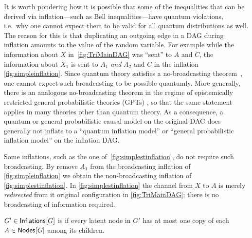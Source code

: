 It is worth pondering how it is possible that some of the inequalities that can be derived via inflation---such as Bell inequalities---have quantum violations, i.e.~why one cannot expect them to be valid for all quantum distributions as well. The reason for this is that duplicating an outgoing edge in a DAG during inflation amounts to  the value of the random variable. For example while the information about $X$ in~\cref{fig:TriMainDAG} was ``sent'' to $A$ and $C$, the information about $X_1$ is sent to $A_1$ \emph{and} $A_2$ and $C$ in the inflation \cref{fig:simpleinflation}. Since quantum theory satisfies a no-broadcasting theorem~\cite{NoCloningQuantum1996,NoCloningGeneral2006}, one cannot expect such broadcasting to be possible quantumly. More generally, there is an analogous no-broadcasting theorem in the regime of epistemically restricted general probabilistic theories (GPTs) \cite{SpekkensToyTheory,NoCloningGeneral2006,Barnum2012GPT,Janotta2014GPT}, so that the same statement applies in many theories other than quantum theory. As a consequence, a quantum or general probabilistic causal model on the original DAG does generally not inflate to a ``quantum inflation model'' or ``general probabilistic inflation model'' on the inflation DAG. 

Some inflations, such as the one of~\cref{fig:simplestinflation}, do not require such broadcasting. By remove $A_1$ from the broadcasting inflation of \cref{fig:simpleinflation} we obtain the non-broadcasting inflation of \cref{fig:simplestinflation}. In \cref{fig:simplestinflation} the channel from $X$ to $A$ is merely \emph{redirected} from it original configuration in \cref{fig:TriMainDAG}; there is no broadcasting of information required.

\begin{definition}
	$G'\in{\operatorname{\mathsf{Inflations}}_{}}\lbrack G\rbrack$ is  if every latent node in $G'$ has at most one copy of each $A\in{\operatorname{\mathsf{Nodes}}_{}}\lbrack G\rbrack$ among its children.
\end{definition}


